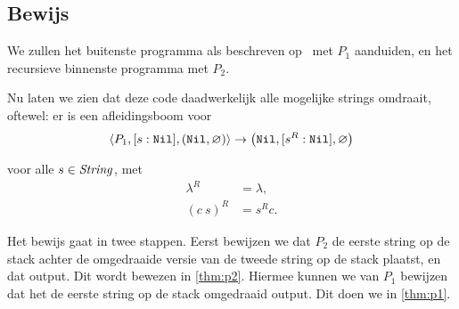 \subsection{Bewijs}
\label{sec:analyse:proof}

We zullen het buitenste programma als beschreven op~\pageref{pgm:reverse} met
$P_1$ aanduiden, en het recursieve binnenste programma met $P_2$.

Nu laten we zien dat deze code daadwerkelijk alle mogelijke strings omdraait,
oftewel: er is een afleidingsboom voor
$$
\left\langle P_1,[s:\texttt{Nil}],(\texttt{Nil},\varnothing)\right\rangle\to\left(\texttt{Nil},[s^R:\texttt{Nil}],\varnothing\right)
$$

voor alle $s\in\mathit{String}$, met
\begin{align*}
	\lambda^R &= \lambda, \\
	(c~s)^R   &= s^R c.
\end{align*}

Het bewijs gaat in twee stappen. Eerst bewijzen we dat $P_2$ de eerste string
op de stack achter de omgedraaide versie van de tweede string op de stack
plaatst, en dat output. Dit wordt bewezen in \autoref{thm:p2}. Hiermee kunnen
we van $P_1$ bewijzen dat het de eerste string op de stack omgedraaid output.
Dit doen we in \autoref{thm:p1}.

